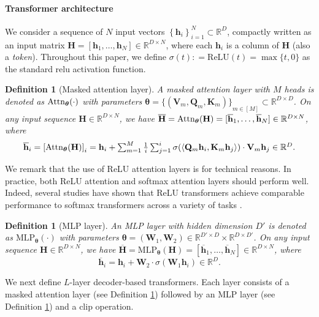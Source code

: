 \documentclass[10pt]{article}
\newtheorem{definition}[theorem]{Definition}
\renewcommand{\bar}{\overline}
\newcommand{\<}{\left\langle}
\renewcommand{\>}{\right\rangle}
\renewcommand{\bQ}{\mathbf{Q}}
\newcommand{\relu}{\mathrm{ReLU}}
\newcommand{\Attn}{{\rm Attn}}
\newcommand{\barsig}{\sigma}
\newcommand{\MLP}{\mathrm{MLP}}
\newcommand{\paren}[1]{{\left( #1 \right)}}
\newcommand{\brac}[1]{{\left[ #1 \right]}}
\newcommand{\set}[1]{{\left\{ #1 \right\}}}
\newcommand{\sets}[1]{{\{ #1 \}}}
\newcommand{\defeq}{\mathrel{\mathop:}=}
\newcommand{\R}{\mathbb{R}}
\def\bH{{\mathbf H}}
\def\bK{{\mathbf K}}
\def\bQ{{\mathbf Q}}
\def\bV{{\mathbf V}}
\def\bW{{\mathbf W}}
\def\btheta{{\boldsymbol \theta}}
\def\bh{{\mathbf h}}
\begin{document}
\paragraph{Transformer architecture} We consider a sequence of $N$ input vectors $\set{\bh_i}_{i=1}^N\subset \R^D$, compactly written as an input matrix $\bH=[\bh_1,\dots,\bh_N]\in \R^{D\times N}$, where each $\bh_i$ is a column of $\bH$ (also a \emph{token}). Throughout this paper, we define $\sigma(t)\defeq \relu(t)=\max\sets{t,0}$ as the standard relu activation function.
\begin{definition}[Masked attention layer]
\label{def:masked-attention}
A masked attention layer with $M$ heads is denoted as $\Attn_{\btheta}(\cdot)$ with parameters $\btheta=\sets{ (\bV_m,\bQ_m,\bK_m)}_{m\in[M]}\subset \R^{D\times D}$. On any input sequence $\bH\in\R^{D\times N}$, we have $\bar{\bH} = \Attn_{\btheta}(\bH) = [\bar{\bh}_1, \ldots, \bar{\bh}_N] \in \R^{D \times N}$, where
\begin{align*}
\textstyle    \bar{\bh}_i = \brac{\Attn_{\btheta}(\bH)}_i = \bh_i + \sum_{m=1}^M \frac{1}{i}\sum_{j=1}^i \barsig\paren{ \<\bQ_m\bh_i, \bK_m\bh_j\> }\cdot \bV_m\bh_j \in \R^D.
\end{align*}
\end{definition}
We remark that the use of ReLU attention layers is for technical reasons. In practice, both ReLU attention and softmax attention layers should perform well. Indeed, several studies have shown that ReLU transformers achieve comparable performance to softmax transformers  across a variety of tasks \citep{wortsman2023replacing, shen2023study, bai2023transformers}.
\begin{definition}[MLP layer]
\label{def:mlp}
An MLP layer with hidden dimension $D'$ is denoted as $\MLP_{\btheta}(\cdot)$ with parameters $\btheta=(\bW_1,\bW_2)\in\R^{D'\times D}\times\R^{D\times D'}$. On any input sequence $\bH\in\R^{D\times N}$, we have $\bar{\bH} = \MLP_{\btheta}(\bH) = [\bar{\bh}_1, \ldots, \bar{\bh}_N] \in \R^{D \times N}$, where
\[
\bar{\bh}_i=\bh_i+\bW_2 \cdot \sigma(\bW_1\bh_i) \in \R^D.
\]
\end{definition}
We next define $L$-layer decoder-based transformers. Each layer consists of a masked attention layer (see Definition \ref{def:masked-attention}) followed by an MLP layer (see Definition \ref{def:mlp}) and a clip operation.
\end{document}
